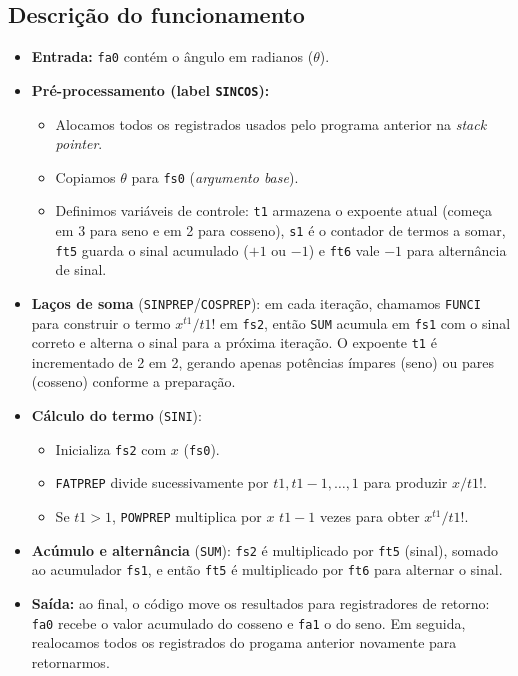 \documentclass[12pt,a4paper]{article}
\begin{document}
\subsection*{Descrição do funcionamento}
\begin{itemize}
    \item \textbf{Entrada:} \texttt{fa0} contém o ângulo em radianos (\(\theta\)).
    \item \textbf{Pré-processamento (label \texttt{SINCOS}):}
    \begin{itemize}
        \item Alocamos todos os registrados usados pelo programa anterior na \textit{stack pointer}.
        \item Copiamos \(\theta\) para \texttt{fs0} (\textit{argumento base}).
        \item Definimos variáveis de controle: \texttt{t1} armazena o expoente atual (começa em 3 para seno e em 2 para cosseno), \texttt{s1} é o contador de termos a somar, \texttt{ft5} guarda o sinal acumulado (\(+1\) ou \(-1\)) e \texttt{ft6} vale \(-1\) para alternância de sinal.
    \end{itemize}
    \item \textbf{Laços de soma} (\texttt{SINPREP}/\texttt{COSPREP}): em cada iteração, chamamos \texttt{FUNCI} para construir o termo \(x^{t1}/t1!\) em \texttt{fs2}, então \texttt{SUM} acumula em \texttt{fs1} com o sinal correto e alterna o sinal para a próxima iteração. O expoente \texttt{t1} é incrementado de 2 em 2, gerando apenas potências ímpares (seno) ou pares (cosseno) conforme a preparação.
    \item \textbf{Cálculo do termo} (\texttt{SINI}):
    \begin{itemize}
        \item Inicializa \texttt{fs2} com \(x\) (\texttt{fs0}).
        \item \texttt{FATPREP} divide sucessivamente por \(t1, t1-1, \dots, 1\) para produzir \(x/t1!\).
        \item Se \(t1>1\), \texttt{POWPREP} multiplica por \(x\) \(t1-1\) vezes para obter \(x^{t1}/t1!\).
    \end{itemize}
    \item \textbf{Acúmulo e alternância} (\texttt{SUM}): \texttt{fs2} é multiplicado por \texttt{ft5} (sinal), somado ao acumulador \texttt{fs1}, e então \texttt{ft5} é multiplicado por \texttt{ft6} para alternar o sinal.
    \item \textbf{Saída:} ao final, o código move os resultados para registradores de retorno: \texttt{fa0} recebe o valor acumulado do cosseno e \texttt{fa1} o do seno. Em seguida, realocamos todos os registrados do progama anterior novamente para retornarmos.
\end{itemize}
\end{document}
